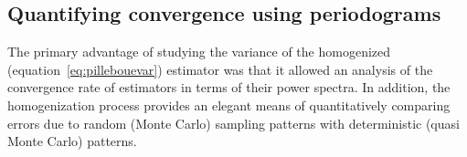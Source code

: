 \subsection{Quantifying convergence using periodograms}
The primary advantage of studying the variance of the homogenized (equation~\ref{eq:pillebouevar}) estimator was that it allowed an analysis of the convergence rate of estimators in terms of their power spectra. In addition, the homogenization process provides an elegant means of quantitatively comparing errors due to random (Monte Carlo) sampling patterns with deterministic (quasi Monte Carlo) patterns.

\TBC